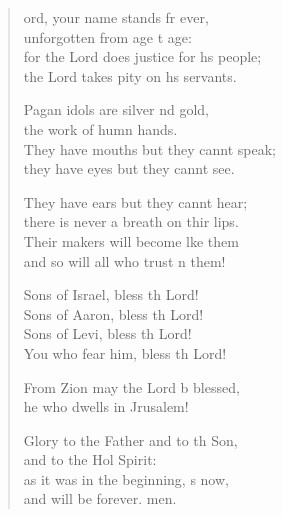 \begin{verse}
  \begin{patverse}
ord, your name stands fr ever,\Med\\
unforgotten from age t age:\\
for the Lord does justice for h\pointup{\i}s people;\Med\\
the Lord takes pity on h\pointup{\i}s servants.

Pagan idols are silver nd gold,\Med\\
the work of humn hands.\\
They have mouths but they cannt speak;\Med\\
they have eyes but they cannt see.

They have ears but they cannt hear;\Med\\
there is never a breath on thir lips.\\
Their makers will become l\pointup{\i}ke them\Med\\
and so will all who trust \pointup{\i}n them!

Sons of Israel, bless th Lord!\Med\\
Sons of Aaron, bless th Lord!\\
Sons of Levi, bless th Lord!\Med\\
You who fear him, bless th Lord!

From Zion may the Lord b blessed,\Med\\
he who dwells in Jrusalem!

Glory to the Father and to th Son,\Med\\
and to the Hol Spirit:\\
as it was in the beginning, \pointup{\i}s now,\Med\\
and will be forever. men.
  \end{patverse}
\end{verse}
